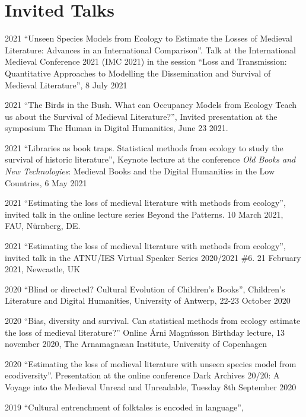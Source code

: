 \documentclass[12pt,letterpaper]{report}
\begin{document}
\section*{Invited Talks}
\begin{tablist}
\item[2021] \tab{}``Unseen Species Models from Ecology to Estimate the Losses of Medieval
  Literature: Advances in an International Comparison''. Talk at the International
  Medieval Conference 2021 (IMC 2021) in the session “Loss and Transmission: Quantitative
  Approaches to Modelling the Dissemination and Survival of Medieval Literature”, 8 July
  2021
\item[2021] \tab{}``The Birds in the Bush. What can Occupancy Models from Ecology Teach us
  about the Survival of Medieval Literature?'', Invited presentation at the symposium The
  Human in Digital Humanities, June 23 2021. 
\item[2021] \tab{}``Libraries as book traps. Statistical methods from ecology to study the
  survival of historic literature'', Keynote lecture at the conference \textit{Old Books
    and New Technologies}: Medieval Books and the Digital Humanities in the Low Countries,
  6 May 2021
\item[2021] \tab{}``Estimating the loss of medieval literature with methods from
  ecology'', invited talk in the online lecture series Beyond the Patterns. 10 March 2021,
  FAU, Nürnberg, DE. 
\item[2021] \tab{}``Estimating the loss of medieval literature with methods from
    ecology'', invited talk in the ATNU/IES Virtual Speaker Series 2020/2021 \#6. 21
    February 2021, Newcastle, UK
\item[2020] \tab{}``Blind or directed? Cultural Evolution of Children's Books'',
    Children’s Literature and Digital Humanities, University of Antwerp, 22-23 October
    2020
\item[2020] \tab{}``Bias, diversity and survival. Can statistical methods from ecology
    estimate the loss of medieval literature?'' Online Árni Magnússon Birthday lecture, 13
    november 2020, The Arnamagnæan Institute, University of Copenhagen
\item[2020] \tab{}``Estimating the loss of medieval literature with unseen species model
    from ecodiversity''. Presentation at the online conference Dark Archives 20/20: A
    Voyage into the Medieval Unread and Unreadable, Tuesday 8th September 2020
\item[2019] \tab{}``Cultural entrenchment of folktales is encoded in language'',

\end{tablist}
\end{document}
